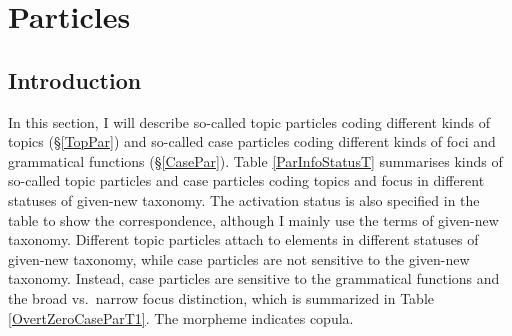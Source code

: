 \chapter{Particles}\label{Particles}



\section{Introduction}\label{ParIntro}

In this section, I will describe
so-called topic particles coding different kinds of topics (\S \ref{TopPar})
and
so-called case particles coding different kinds of foci and grammatical functions (\S \ref{CasePar}).
Table \ref{ParInfoStatusT} summarises kinds of so-called topic particles and case particles
coding topics and focus in different statuses of given-new taxonomy.
The activation status is also specified in the table to show the correspondence,
although I mainly use the terms of given-new taxonomy.
Different topic particles attach to elements in different statuses of given-new taxonomy,
while case particles are not sensitive to the given-new taxonomy.
Instead, case particles are sensitive to the grammatical functions and the broad vs.\ narrow focus distinction,
which is summarized in Table \ref{OvertZeroCaseParT1}.
The morpheme  indicates copula.

